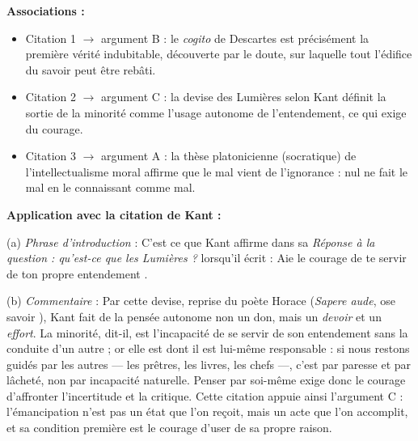 \documentclass[11pt]{article}
\begin{document}
\begin{corrige}
\textbf{Associations :}
\begin{itemize}
\item Citation 1 $\rightarrow$ argument B : le \emph{cogito} de Descartes est précisément la première vérité indubitable, découverte par le doute, sur laquelle tout l'édifice du savoir peut être rebâti.
\item Citation 2 $\rightarrow$ argument C : la devise des Lumières selon Kant définit la sortie de la minorité comme l'usage autonome de l'entendement, ce qui exige du courage.
\item Citation 3 $\rightarrow$ argument A : la thèse platonicienne (socratique) de l'intellectualisme moral affirme que le mal vient de l'ignorance : nul ne fait le mal en le connaissant comme mal.
\end{itemize}

\textbf{Application avec la citation de Kant :}

(a) \emph{Phrase d'introduction} : \guillemotleft C'est ce que Kant affirme dans sa \emph{Réponse à la question : qu'est-ce que les Lumières ?} lorsqu'il écrit : \guillemotleft Aie le courage de te servir de ton propre entendement \guillemotright. \guillemotright

(b) \emph{Commentaire} : Par cette devise, reprise du poète Horace (\emph{Sapere aude}, \guillemotleft ose savoir \guillemotright), Kant fait de la pensée autonome non un don, mais un \emph{devoir} et un \emph{effort}. La minorité, dit-il, est \guillemotleft l'incapacité de se servir de son entendement sans la conduite d'un autre \guillemotright ; or elle est \guillemotleft dont il est lui-même responsable \guillemotright : si nous restons guidés par les autres --- les prêtres, les livres, les chefs ---, c'est par paresse et par lâcheté, non par incapacité naturelle. Penser par soi-même exige donc le courage d'affronter l'incertitude et la critique. Cette citation appuie ainsi l'argument C : l'émancipation n'est pas un état que l'on reçoit, mais un acte que l'on accomplit, et sa condition première est le courage d'user de sa propre raison.
\end{corrige}
\end{document}
